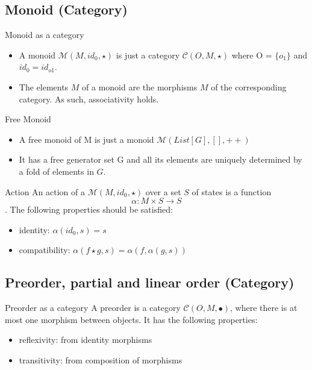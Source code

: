 \documentclass[presentation]{beamer}
\begin{document}
\subsection{Monoid (Category)}
\label{sec:orge3c14e8}

\begin{frame}[label={sec:org1cde801}]{Monoid as a category}
\begin{itemize}
\item A monoid \(\mathcal{M}(M, id_0, \star)\) is just a category \(\mathcal{C}(O, M, \star)\) where O = \(\{ o_1 \}\) and \(id_0 = id_{o1}\).

\item The elements \(M\) of a monoid are the morphisms \(M\) of the corresponding
category. As such, \alert{associativity} holds.
\end{itemize}
\end{frame}

\begin{frame}[label={sec:org7ee1ba1}]{Free Monoid}
\begin{itemize}
\item A free monoid of M is just a monoid \(\mathcal{M}(List[G], [], ++)\)

\item It has a free generator set G and all its elements are uniquely determined by
a fold of elements in \(G\).
\end{itemize}
\end{frame}

\begin{frame}[label={sec:org242fae4}]{Action}
An action of a \(\mathcal{M}(M, id_0, \star)\) over a set \(S\) of states is a
function  \[ \alpha: M \times S \rightarrow S \]. The following properties should be satisfied:

\begin{itemize}
\item identity: \(\alpha(id_0, s) = s\)

\item compatibility: \(\alpha(f \star g, s) = \alpha(f, \alpha(g, s))\)
\end{itemize}
\end{frame}


\subsection{Preorder, partial and linear order (Category)}
\label{sec:orgb381835}

\begin{frame}[label={sec:org1c5bae1}]{Preorder as a category}
A \alert{preorder} is a category \(\mathcal{C}(O, M, \bullet)\), where there is at most one
morphism between objects. It has the following properties:

\begin{itemize}
\item \alert{reflexivity}: from identity morphisms

\item \alert{transitivity}: from composition of morphisms
\end{itemize}
\end{frame}
\end{document}
